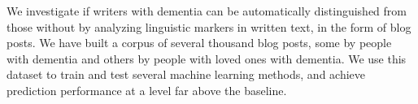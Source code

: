 We investigate if writers with dementia can be automatically distinguished from those without by analyzing linguistic markers in written text, in the form of blog posts. We have built a corpus of several thousand blog posts, some by people with dementia and others by people with loved ones with dementia. We use this dataset to train and test several machine learning methods, and achieve prediction performance at a level far above the baseline.
